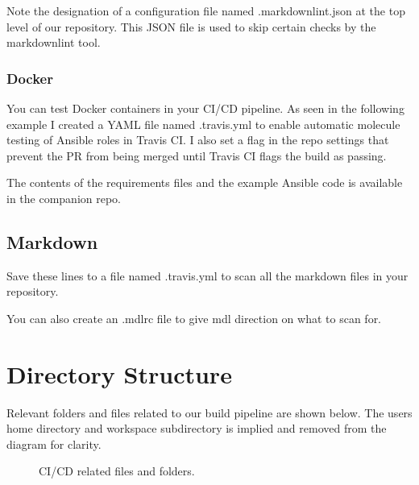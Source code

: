 %	

\justifying
Note the designation of a configuration file named .markdownlint.json at
the top level of our repository. This JSON file is used to skip certain
checks by the markdownlint tool.

%	

\subsubsection{Docker}

\justifying
You can test Docker containers in your CI/CD pipeline. As seen in the
following example I created a YAML file named .travis.yml to enable
automatic molecule testing of Ansible roles in Travis CI. I also set a
flag in the repo settings that prevent the PR from being merged until
Travis CI flags the build as passing.

%	
\justifying
The contents of the requirements files and the example Ansible code is
available in the companion repo.

\subsection{Markdown}
\justifying
Save these lines to a file named .travis.yml to scan all the markdown files in your
repository.

%	

\justifying
You can also create an .mdlrc file to give mdl direction on what to scan for.

%	

\clearpage

\section{Directory Structure}

\justifying
Relevant folders and files related to our build pipeline are shown below. The users
home directory
and workspace subdirectory is implied and removed from the diagram for clarity.

\begin{figure}[!htb]
	
	\caption{CI/CD related files and folders.}
\label{cicdfiles}
\end{figure}

